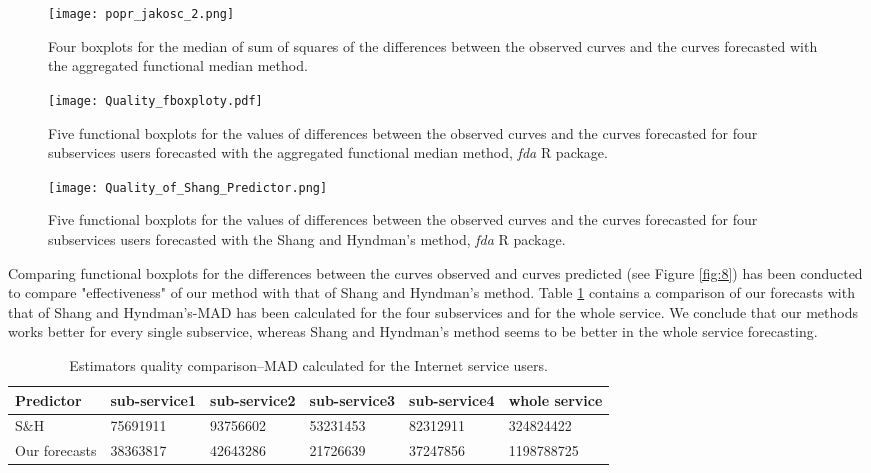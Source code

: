 \documentclass[12pt,a4paper]{article}
\numberwithin{equation}{section}
\begin{document}
\begin{figure*}
\texttt{[image: popr\_jakosc\_2.png]}
\caption{
Four boxplots for the median of sum of squares of the differences between the observed curves and the curves forecasted with the aggregated functional median method.}
\label{fig:16}
\end{figure*} 
\begin{figure*}
\texttt{[image: Quality\_fboxploty.pdf]}
\caption{
Five functional boxplots for the values of differences between the observed curves and the curves forecasted for four subservices users forecasted  with the aggregated functional median method, \textit{fda} R package.}
\label{fig:17}
\end{figure*}
\begin{figure*}
\texttt{[image: Quality\_of\_Shang\_Predictor.png]}
\caption{
Five functional boxplots for the values of differences between the observed curves and the curves forecasted for four subservices users forecasted  with the Shang and Hyndman's method, \textit{fda} R package.}
\label{fig:18}
\end{figure*}
Comparing functional boxplots for the differences between the curves observed and curves predicted (see Figure \ref{fig:8}) has been conducted to compare "effectiveness" of our method with that of Shang and Hyndman's method.
Table \ref{tab:1} contains a comparison of our forecasts with that of Shang and Hyndman's-MAD has been calculated for the four subservices and for the whole service. We conclude that our methods works better for every single subservice, whereas Shang and Hyndman's method seems to be better in the whole service forecasting.
\begin{table}
\caption{Estimators quality comparison--MAD calculated for the Internet service users.}
\label{tab:1} 
\centering
\begin{tabular}{l|lllll}\hline
\noalign{\smallskip}
Predictor & sub-service1 & sub-service2& sub-service3& sub-service4& whole service\\\hline
S\&H & 75691911& 93756602& 53231453& 82312911 & 324824422\\
Our forecasts & 38363817& 42643286& 21726639& 37247856&1198788725\\
\hline
\end{tabular}
\end{table}
\end{document}
